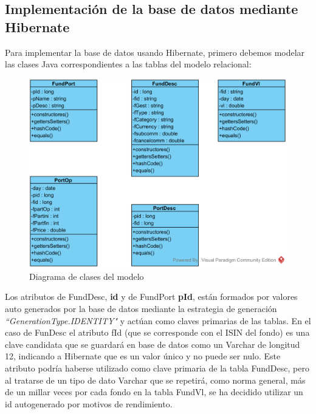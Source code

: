 \documentclass[12pt, a4paper]{article}
\begin{document}
\newpage

\subsection{Implementación de la base de datos mediante Hibernate}

Para implementar la base de datos usando Hibernate, primero debemos modelar las clases Java correspondientes a las tablas del modelo relacional:\\

\begin{figure}[htbp]
	\centering
	\includegraphics[width=\textwidth]{figuras/Diagrama_clases.png}
	\caption{Diagrama de clases del modelo}
	\label{fig:mclases}
	\end {figure}

Los atributos de FundDesc, \textbf{id} y de FundPort \textbf{pId}, están formados por valores auto generados por la base de datos mediante la estrategia de generación \textit{``GenerationType.IDENTITY"} y actúan como claves primarias de las tablas. En el caso de FunDesc el atributo fId (que se corresponde con el \gls{ISIN} del fondo) es una clave candidata que se guardará en base de datos como un Varchar de longitud 12, indicando a Hibernate que es un valor único y no puede ser nulo. Este atributo podría haberse utilizado como clave primaria de la tabla FundDesc, pero al tratarse de un tipo de dato Varchar que se repetirá, como norma general, más de un millar veces por cada fondo en la tabla FundVl, se ha decidido utilizar un id autogenerado por motivos de rendimiento.\\
\end{document}
